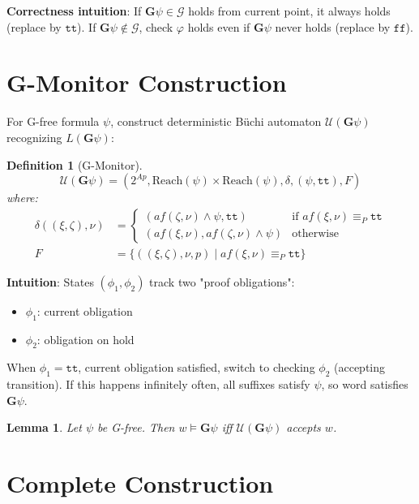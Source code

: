 \documentclass{article}
\newtheorem{definition}{Definition}
\newtheorem{lemma}{Lemma}
\begin{document}
\textbf{Correctness intuition}: If $\mathbf{G}\psi \in \mathcal{G}$ holds from current point, it always holds (replace by $\mathtt{tt}$). If $\mathbf{G}\psi \notin \mathcal{G}$, check $\varphi$ holds even if $\mathbf{G}\psi$ never holds (replace by $\mathtt{ff}$).

\section{G-Monitor Construction}

For G-free formula $\psi$, construct deterministic Büchi automaton $\mathcal{U}(\mathbf{G}\psi)$ recognizing $L(\mathbf{G}\psi)$:

\begin{definition}[G-Monitor]
\begin{equation}
\mathcal{U}(\mathbf{G}\psi) = (2^{Ap}, \text{Reach}(\psi) \times \text{Reach}(\psi), \delta, (\psi, \mathtt{tt}), F)
\end{equation}
where:
\begin{align}
\delta((\xi, \zeta), \nu) &= \begin{cases}
(af(\zeta, \nu) \land \psi, \mathtt{tt}) & \text{if } af(\xi, \nu) \equiv_P \mathtt{tt}\\
(af(\xi, \nu), af(\zeta, \nu) \land \psi) & \text{otherwise}
\end{cases}\\
F &= \{((\xi, \zeta), \nu, p) \mid af(\xi, \nu) \equiv_P \mathtt{tt}\}
\end{align}
\end{definition}

\textbf{Intuition}: States $(\phi_1, \phi_2)$ track two "proof obligations":
\begin{itemize}
    \item $\phi_1$: current obligation
    \item $\phi_2$: obligation on hold
\end{itemize}

When $\phi_1 = \mathtt{tt}$, current obligation satisfied, switch to checking $\phi_2$ (accepting transition). If this happens infinitely often, all suffixes satisfy $\psi$, so word satisfies $\mathbf{G}\psi$.

\begin{lemma}
Let $\psi$ be G-free. Then $w \models \mathbf{G}\psi$ iff $\mathcal{U}(\mathbf{G}\psi)$ accepts $w$.
\end{lemma}

\section{Complete Construction}
\end{document}
